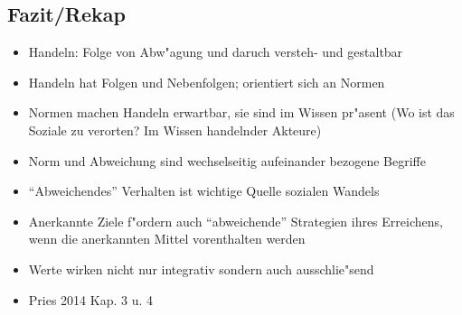 \subsection{Fazit/Rekap}
\begin{itemize}
	\item
		Handeln: Folge von Abw"agung und daruch versteh- und gestaltbar
	\item
		Handeln hat Folgen und Nebenfolgen; orientiert sich an Normen
	\item
	Normen machen Handeln erwartbar, sie sind im Wissen pr"asent (Wo ist das Soziale zu verorten? Im Wissen handelnder Akteure)
\item
	Norm und Abweichung sind wechselseitig aufeinander bezogene Begriffe
\item
	\enquote{Abweichendes} Verhalten ist wichtige Quelle sozialen Wandels
\item
	Anerkannte Ziele f"ordern auch \enquote{abweichende} Strategien ihres Erreichens, wenn die anerkannten Mittel vorenthalten werden
\item
	Werte wirken nicht nur integrativ sondern auch ausschlie"send
\item
	Pries 2014 Kap. 3 u. 4
\end{itemize}


